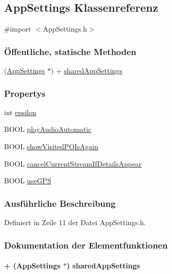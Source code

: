 \hypertarget{interface_app_settings}{
\subsection{AppSettings Klassenreferenz}
\label{interface_app_settings}
}


{\ttfamily \#import $<$AppSettings.h$>$}\subsubsection*{Öffentliche, statische Methoden}
\begin{DoxyCompactItemize}
\item 
(\hyperlink{interface_app_settings}{AppSettings} $\ast$) + \hyperlink{interface_app_settings_aeeaa42128ecb6a3f1642481a8f628760}{sharedAppSettings}
\end{DoxyCompactItemize}
\subsubsection*{Propertys}
\begin{DoxyCompactItemize}
\item 
int \hyperlink{interface_app_settings_a6519c7f0aa9a539c7bddc016b4b7b019}{epsilon}
\item 
BOOL \hyperlink{interface_app_settings_afea0cc95e3f830ecdac947db7dad2cb6}{playAudioAutomatic}
\item 
BOOL \hyperlink{interface_app_settings_af7ae7b5c83724aff405927b79144958c}{showVisitedPOIsAgain}
\item 
BOOL \hyperlink{interface_app_settings_adad66f85ce01f0256a12afa6e44a0529}{cancelCurrentStreamIfDetailsAppear}
\item 
BOOL \hyperlink{interface_app_settings_ab55e564f5442214c576ee05d7c43b171}{useGPS}
\end{DoxyCompactItemize}


\subsubsection{Ausführliche Beschreibung}


Definiert in Zeile 11 der Datei AppSettings.h.

\subsubsection{Dokumentation der Elementfunktionen}
\hypertarget{interface_app_settings_aeeaa42128ecb6a3f1642481a8f628760}{
\paragraph[{sharedAppSettings}]{\setlength{\rightskip}{0pt plus 5cm}+ ({\bf AppSettings} $\ast$) sharedAppSettings }\hfill}
\label{interface_app_settings_aeeaa42128ecb6a3f1642481a8f628760}


